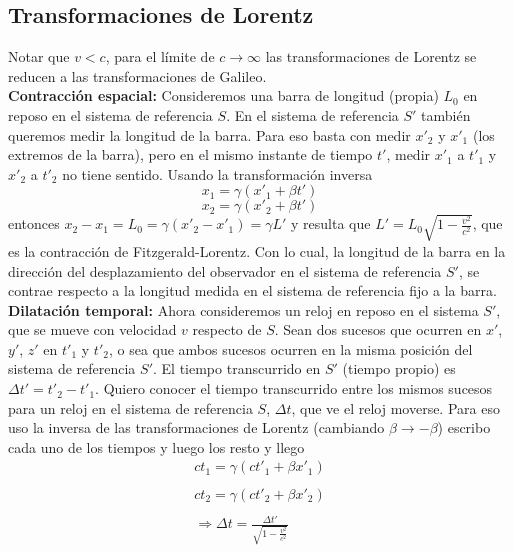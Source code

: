 \subsection{Transformaciones de Lorentz}
Notar que $v < c$, para el límite de $c \to \infty$ las transformaciones de Lorentz se reducen a las transformaciones de Galileo.\\
\indent \textbf{Contracción espacial:} Consideremos una barra de longitud (propia) $L_{0}$ en reposo en el sistema de referencia $S$. En el sistema de referencia $S'$ también queremos medir la longitud de la barra. Para eso basta con medir $x'_{2}$ y $x'_{1}$ (los extremos de la barra), pero en el mismo instante de tiempo $t'$, medir $x'_{1}$ a $t'_{1}$ y $x'_{2}$ a $t'_{2}$ no tiene sentido. Usando la transformación inversa
\begin{equation*}
    x_{1} = \gamma(x'_{1} + \beta t')
\end{equation*}
\begin{equation*}
    x_{2} = \gamma(x'_{2} + \beta t')
\end{equation*}
entonces $x_{2} - x_{1} = L_{0} = \gamma(x'_{2} - x'_{1}) = \gamma L'$ y resulta que $L ' = L_{0}\sqrt{1 - \frac{v^{2}}{c^{2}}}$, que es la contracción de Fitzgerald-Lorentz. Con lo cual, la longitud de la barra en la dirección del desplazamiento del observador en el sistema de referencia $S'$, se contrae respecto a la longitud medida en el sistema de referencia fijo a la barra.\\
\indent \textbf{Dilatación temporal:} Ahora consideremos un reloj en reposo en el sistema $S'$, que se mueve con velocidad $v$ respecto de $S$. Sean dos sucesos que ocurren en $x'$, $y'$, $z'$ en $t'_{1}$ y $t'_{2}$, o sea que ambos sucesos ocurren en la misma posición del sistema de referencia $S'$. El tiempo transcurrido en $S'$ (tiempo propio) es $\Delta t' = t'_{2} - t'_{1}$. Quiero conocer el tiempo transcurrido entre los mismos sucesos para un reloj en el sistema de referencia $S$, $\Delta t$, que ve el reloj moverse. Para eso uso la inversa de las transformaciones de Lorentz (cambiando $\beta \longrightarrow - \beta$) escribo cada uno de los tiempos y luego los resto y llego
\begin{equation*}
    \begin{matrix}
    ct_{1} = \gamma(ct'_{1} + \beta x'_{1})\\
    \\
    ct_{2} = \gamma(ct'_{2} + \beta x'_{2})\\
    \\
    \Longrightarrow \Delta t = \frac{\Delta t'}{\sqrt{1 - \frac{v^{2}}{c^{2}}}}
    \end{matrix}
\end{equation*}

